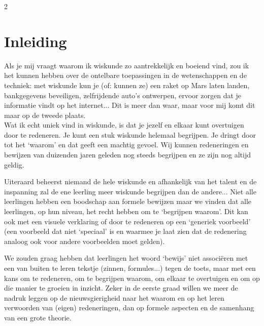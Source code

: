 \startcontents[mainsections]		      %
\begin{multicols}{2}                      
\inhoudstafelLoep		                  %

\section{Inleiding}
Als je mij vraagt waarom ik wiskunde zo aantrekkelijk en boeiend vind, zou ik het kunnen hebben over de ontelbare toepassingen in de wetenschappen en de techniek: met wiskunde kun je (of: kunnen ze) een raket op Mars laten landen, bankgegevens beveiligen, zelfrijdende auto's ontwerpen, ervoor zorgen dat je informatie vindt op het internet... Dit is meer dan waar, maar voor mij komt dit maar op de tweede plaats. 
\\Wat ik echt uniek vind in wiskunde, is dat je jezelf en elkaar kunt overtuigen door te redeneren. Je kunt een stuk wiskunde helemaal begrijpen. Je dringt door tot het `waarom' en dat geeft een machtig gevoel. Wij kunnen redeneringen en bewijzen van duizenden jaren geleden nog steeds begrijpen en ze zijn nog altijd geldig.

Uiteraard beheerst niemand de hele wiskunde en afhankelijk van het talent en de inspanning zal de ene leerling meer wiskunde begrijpen dan de andere... Niet alle leerlingen hebben een boodschap aan formele bewijzen maar we vinden dat alle leerlingen, op hun niveau, het recht hebben om te `begrijpen waarom'. Dit kan ook met een visuele verklaring of door te redeneren op een `generiek voorbeeld' (een voorbeeld dat niet `speciaal' is en waarmee je laat zien dat de redenering analoog ook voor andere voorbeelden moet gelden).

We zouden graag hebben dat leerlingen het woord `bewijs' niet associëren met een van buiten te leren tekstje (zinnen, formules...) tegen de toets, maar met een kans om te redeneren, om te begrijpen waarom, om elkaar te overtuigen en om op die manier te groeien in inzicht. Zeker in de eerste graad willen we meer de nadruk leggen op de nieuwsgierigheid naar het waarom en op het leren verwoorden van (eigen) redeneringen, dan op formele aspecten en de samenhang van een grote theorie.


\end{multicols}
